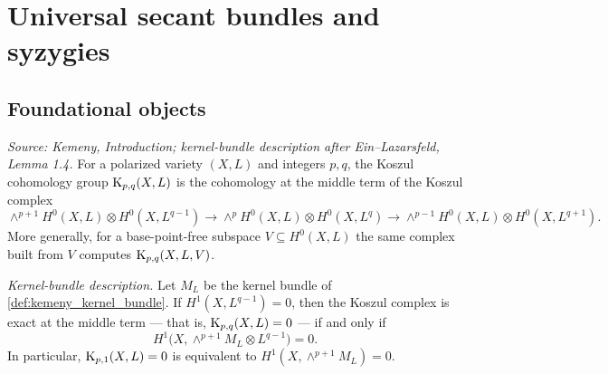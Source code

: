 \section{Universal secant bundles and syzygies}


\subsection{Foundational objects}

\begin{definition}
  \label{def:kemeny_koszul_cohomology}
  \textit{Source: Kemeny, Introduction; kernel-bundle description after Ein--Lazarsfeld, Lemma 1.4.}
  For a polarized variety \((X,L)\) and integers \(p,q\), the Koszul cohomology
  group \(\mathrm{K}_{p,q}(X,L)\) is the cohomology at the middle term of the Koszul
  complex
  \[
    \wedge^{p+1}H^0(X,L)\otimes H^0(X,L^{q-1})
      \to \wedge^{p}H^0(X,L)\otimes H^0(X,L^{q})
      \to \wedge^{p-1}H^0(X,L)\otimes H^0(X,L^{q+1}).
  \]
  More generally, for a base-point-free subspace \(V\subseteq H^0(X,L)\) the same
  complex built from \(V\) computes \(\mathrm{K}_{p,q}(X,L,V)\).

  \emph{Kernel-bundle description.}  Let \(M_L\) be the kernel bundle of
  \cref{def:kemeny_kernel_bundle}.  If \(H^1(X,L^{q-1})=0\), then the Koszul
  complex is exact at the middle term --- that is, \(\mathrm{K}_{p,q}(X,L)=0\) --- if and
  only if
  \[
    H^1\bigl(X,\wedge^{p+1}M_L\otimes L^{q-1}\bigr)=0 .
  \]
  In particular, \(\mathrm{K}_{p,1}(X,L)=0\) is equivalent to
  \(H^1(X,\wedge^{p+1}M_L)=0\).
\end{definition}

